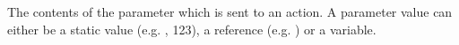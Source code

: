 \item[Parameter Value]{
The contents of the parameter which is sent to an action. A parameter value can either be a static value (e.g. , 123), a reference (e.g. ) or a variable.
}
